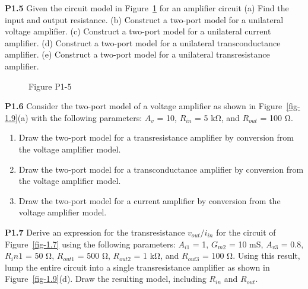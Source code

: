\documentclass[
  11pt,
  letterpaper,
  abstract]{scrbook}
\providecommand{\tightlist}{%
  \setlength{\itemsep}{0pt}\setlength{\parskip}{0pt}}\usepackage{longtable,booktabs,array}
\begin{document}
\textbf{P1.5} Given the circuit model in Figure~\ref{fig-p1-5} for an
amplifier circuit (a) Find the input and output resistance. (b)
Construct a two-port model for a unilateral voltage amplifier. (c)
Construct a two-port model for a unilateral current amplifier. (d)
Construct a two-port model for a unilateral transconductance amplifier.
(e) Construct a two-port model for a unilateral transresistance
amplifier.

\begin{figure}


\caption{\label{fig-p1-5}Figure P1-5}

\end{figure}%

\textbf{P1.6} Consider the two-port model of a voltage amplifier as
shown in Figure~\ref{fig-1.9}(a) with the following parameters: \(A_v\)
= 10, \(R_{in}\) = 5 kΩ, and \(R_{out}\) = 100 Ω.

\begin{enumerate}
\def\labelenumi{(\alph{enumi})}
\tightlist
\item
  Draw the two-port model for a transresistance amplifier by conversion
  from the voltage amplifier model.
\item
  Draw the two-port model for a transconductance amplifier by conversion
  from the voltage amplifier model.
\item
  Draw the two-port model for a current amplifier by conversion from the
  voltage amplifier model.
\end{enumerate}

\textbf{P1.7} Derive an expression for the transresistance
\(v_{out} / i_{in}\) for the circuit of Figure~\ref{fig-1.7} using the
following parameters: \(A_{i1}\) = 1, \(G_{m2}\) = 10 mS, \(A_{v3}\) =
0.8, \(R_in1\) = 50 Ω, \(R_{out1}\) = 500 Ω, \(R_{out2}\) = 1 kΩ, and
\(R_{out3}\) = 100 Ω. Using this result, lump the entire circuit into a
single transresistance amplifier as shown in Figure~\ref{fig-1.9}(d).
Draw the resulting model, including \(R_{in}\) and \(R_{out}\).
\end{document}
